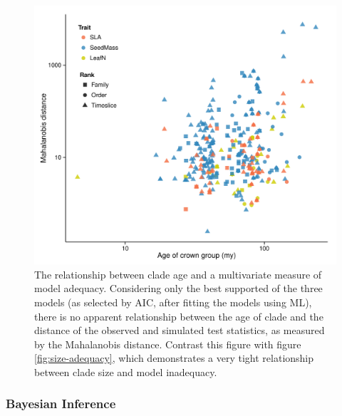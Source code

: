 \begin{figure}[p]
  \centering
  \includegraphics[width=\textwidth]{figs/ad-age-ml}
  \caption[Model adequacy versus clade age (ML)]{The relationship between clade age and a multivariate measure of model adequacy. Considering only the best supported of the three models (as selected by AIC, after fitting the models using ML), there is no  apparent relationship between the age of clade and the distance of the observed and simulated test statistics, as measured by the Mahalanobis distance. Contrast this figure with figure \ref{fig:size-adequacy}, which demonstrates a very tight relationship between clade size and model inadequacy.}
  \label{fig:supp-age-ml}
\end{figure}


\subsubsection{Bayesian Inference}

